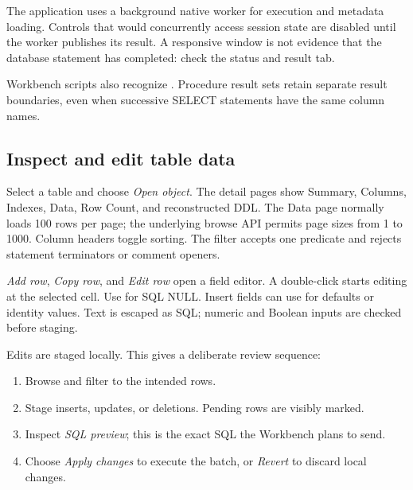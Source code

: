 The application uses a background native worker for execution and metadata loading. Controls that would concurrently access session state are disabled until the worker publishes its result. A responsive window is not evidence that the database statement has completed: check the status and result tab.

Workbench scripts also recognize . Procedure result sets retain
separate result boundaries, even when successive SELECT statements have the same
column names.


\subsection{Inspect and edit table data}

Select a table and choose \emph{Open object}. The detail pages show Summary, Columns, Indexes, Data, Row Count, and reconstructed DDL. The Data page normally loads 100 rows per page; the underlying browse API permits page sizes from 1 to 1000. Column headers toggle sorting. The filter accepts one  predicate and rejects statement terminators or comment openers.

\emph{Add row}, \emph{Copy row}, and \emph{Edit row} open a field editor. A double-click starts editing at the selected cell. Use  for SQL NULL. Insert fields can use  for defaults or identity values. Text is escaped as SQL; numeric and Boolean inputs are checked before staging.

Edits are staged locally. This gives a deliberate review sequence:

\begin{enumerate}
\item Browse and filter to the intended rows.
\item Stage inserts, updates, or deletions. Pending rows are visibly marked.
\item Inspect \emph{SQL preview}; this is the exact SQL the Workbench plans to send.
\item Choose \emph{Apply changes} to execute the batch, or \emph{Revert} to discard local changes.
\end{enumerate}

